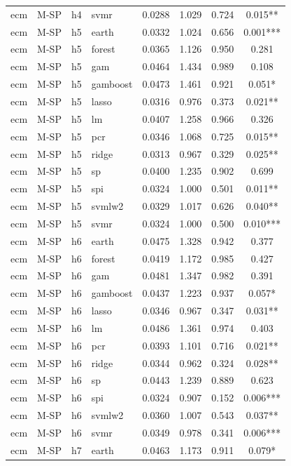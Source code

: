 \begin{ThreePartTable}
\begin{longtable}[t]{llclcccc}
ecm & M-SP & h4 & svmr & 0.0288 & 1.029 & 0.724 & 0.015**\\
\addlinespace
ecm & M-SP & h5 & earth & 0.0332 & 1.024 & 0.656 & 0.001***\\
ecm & M-SP & h5 & forest & 0.0365 & 1.126 & 0.950 & 0.281\\
ecm & M-SP & h5 & gam & 0.0464 & 1.434 & 0.989 & 0.108\\
ecm & M-SP & h5 & gamboost & 0.0473 & 1.461 & 0.921 & 0.051*\\
ecm & M-SP & h5 & lasso & 0.0316 & 0.976 & 0.373 & 0.021**\\
ecm & M-SP & h5 & lm & 0.0407 & 1.258 & 0.966 & 0.326\\
ecm & M-SP & h5 & pcr & 0.0346 & 1.068 & 0.725 & 0.015**\\
ecm & M-SP & h5 & ridge & 0.0313 & 0.967 & 0.329 & 0.025**\\
ecm & M-SP & h5 & sp & 0.0400 & 1.235 & 0.902 & 0.699\\
ecm & M-SP & h5 & spi & 0.0324 & 1.000 & 0.501 & 0.011**\\
ecm & M-SP & h5 & svmlw2 & 0.0329 & 1.017 & 0.626 & 0.040**\\
ecm & M-SP & h5 & svmr & 0.0324 & 1.000 & 0.500 & 0.010***\\
\addlinespace
ecm & M-SP & h6 & earth & 0.0475 & 1.328 & 0.942 & 0.377\\
ecm & M-SP & h6 & forest & 0.0419 & 1.172 & 0.985 & 0.427\\
ecm & M-SP & h6 & gam & 0.0481 & 1.347 & 0.982 & 0.391\\
ecm & M-SP & h6 & gamboost & 0.0437 & 1.223 & 0.937 & 0.057*\\
ecm & M-SP & h6 & lasso & 0.0346 & 0.967 & 0.347 & 0.031**\\
ecm & M-SP & h6 & lm & 0.0486 & 1.361 & 0.974 & 0.403\\
ecm & M-SP & h6 & pcr & 0.0393 & 1.101 & 0.716 & 0.021**\\
ecm & M-SP & h6 & ridge & 0.0344 & 0.962 & 0.324 & 0.028**\\
ecm & M-SP & h6 & sp & 0.0443 & 1.239 & 0.889 & 0.623\\
ecm & M-SP & h6 & spi & 0.0324 & 0.907 & 0.152 & 0.006***\\
ecm & M-SP & h6 & svmlw2 & 0.0360 & 1.007 & 0.543 & 0.037**\\
ecm & M-SP & h6 & svmr & 0.0349 & 0.978 & 0.341 & 0.006***\\
\addlinespace
ecm & M-SP & h7 & earth & 0.0463 & 1.173 & 0.911 & 0.079*\\

\end{longtable}
\end{ThreePartTable}
